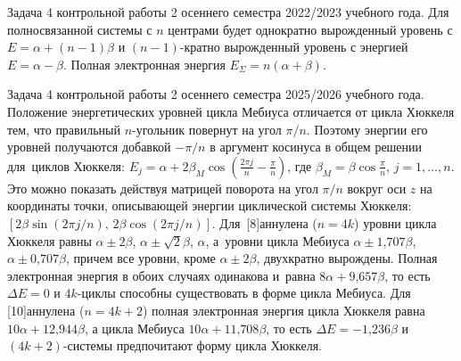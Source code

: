  Задача 4 контрольной работы 2 осеннего семестра 2022/2023 учебного года. Для полносвязанной системы с $n$ центрами будет однократно вырожденный уровень с $E = \alpha + (n - 1)\beta$ и $(n - 1)$-кратно вырожденный уровень с энергией $E = \alpha - \beta$. Полная электронная энергия $E_{\Sigma} = n(\alpha + \beta)$.\par
{} Задача 4 контрольной работы 2 осеннего семестра 2025/2026 учебного года. Положение энергетических уровней цикла Мебиуса отличается от цикла Хюккеля тем, что правильный $n$-угольник повернут на угол $\pi/n$. Поэтому энергии его уровней получаются добавкой $-\pi/n$ в аргумент косинуса в общем решении для~циклов Хюккеля: $E_j=\alpha+2\beta_M \cos{\left( \frac{2\pi j}{n} - \frac{\pi}{n}\right)}$, где $\beta_M=\beta \cos{\frac{\pi}{n}}$, $j=1\text{,}\,\ldots\text{,}\,n$. 
Это можно показать действуя матрицей поворота на угол $\pi/n$ вокруг оси $z$ на координаты точки, описывающей энергии циклической системы Хюккеля: $[2\beta \sin{(2\pi j/n)},\,2\beta \cos {(2\pi j/n)}]$. Для~[8]аннулена ($n=4k$) уровни цикла Хюккеля равны $\alpha \pm 2\beta$, $\alpha \pm \sqrt2 \beta$, $\alpha$, а~уровни цикла Мебиуса $\alpha \pm 1\text{,}707\beta$, $\alpha \pm 0\text{,}707\beta$, причем все уровни, кроме $\alpha \pm 2\beta$, двухкратно вырождены. Полная электронная энергия в обоих случаях одинакова и~равна $8\alpha+9\text{,}657\beta$, то есть $\Delta E = 0$ и $4k$-циклы способны существовать в форме цикла Мебиуса. Для [10]аннулена ($n=4k+2$) полная электронная энергия цикла Хюккеля равна $10\alpha+12\text{,}944\beta$, а цикла Мебиуса $10\alpha+11\text{,}708\beta$, то есть $\Delta E = -1\text{,}236\beta$ и $(4k+2)$-системы предпочитают форму цикла Хюккеля.\par
\newpage

